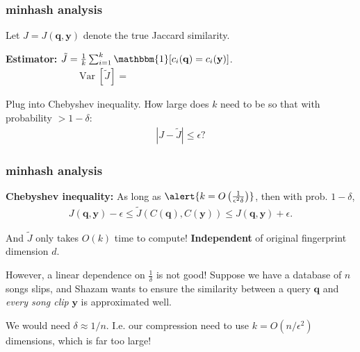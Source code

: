 \documentclass[handout,compress]{beamer}
\newcommand{\bv}[1]{\mathbf{#1}}
\DeclareMathOperator{\Var}{Var}
\begin{document}
\begin{frame}
	\frametitle{minhash analysis}
	Let $J = J(\bv{q},\bv{y})$ denote the true Jaccard similarity.
	
	\textbf{Estimator:} $\tilde{J} = \frac{1}{k} \sum_{i=1}^k \mathbbm{1}[c_i(\bv{q}) = c_i(\bv{y})]$. 
	\begin{align*}
		\Var [\tilde{J}] =\hspace{16em}
	\end{align*}
	
	Plug into Chebyshev inequality. How large does $k$ need to be so that with probability $> 1 - \delta$:
	\begin{align*}
		|J-\tilde{J}| \leq \epsilon?
	\end{align*}
\end{frame}

\begin{frame}
	\frametitle{minhash analysis}
	\textbf{Chebyshev inequality:} As long as $\alert{{k = O\left(\frac{1}{\epsilon^2\delta}\right)}}$, then with prob. $1-\delta$,
	\begin{align*}
		J(\bv{q}, \bv{y}) -\epsilon \leq \tilde{J}\left(C(\bv{q}),C(\bv{y})\right)   \leq J(\bv{q}, \bv{y}) + \epsilon. 
	\end{align*}
		\begin{center}
			And $\tilde{J}$ only takes $O(k)$ time to compute! \alert{\textbf{Independent}} of original fingerprint dimension $d$.
		\end{center}	
	
	However, a linear dependence on $\frac{1}{\delta}$ is not good! Suppose we have a database of $n$ songs slips, and Shazam wants to ensure the similarity between a query $\bv{q}$ and \emph{every song clip} $\bv{y}$ is approximated well. 
	
	We would need $\delta \approx 1/n$. I.e. our compression need to use $k = O(n/\epsilon^2)$ dimensions, which is far too large!
\end{frame}
\end{document}
